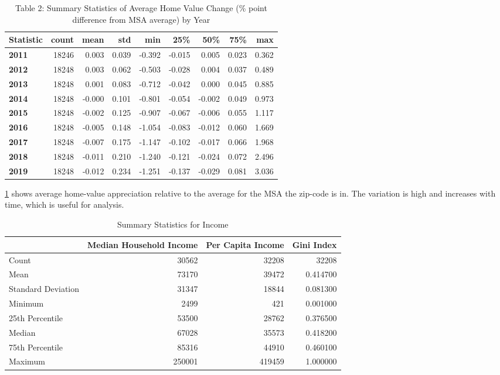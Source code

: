 \documentclass{article}
\begin{document}
\begin{table}[H]
    \centering
    \caption{Table 2: Summary Statistics of Average Home Value Change (\% point difference from MSA average) by Year}
    \label{home_val_table}
\begin{tabular}{l|rrrrrrrr}
\toprule
Statistic & count & mean & std & min & 25\% & 50\% & 75\% & max \\
\midrule
\textbf{2011} & 18246 & 0.003 & 0.039 & -0.392 & -0.015 & 0.005 & 0.023 & 0.362 \\
\textbf{2012} & 18248 & 0.003 & 0.062 & -0.503 & -0.028 & 0.004 & 0.037 & 0.489 \\
\textbf{2013} & 18248 & 0.001 & 0.083 & -0.712 & -0.042 & 0.000 & 0.045 & 0.885 \\
\textbf{2014} & 18248 & -0.000 & 0.101 & -0.801 & -0.054 & -0.002 & 0.049 & 0.973 \\
\textbf{2015} & 18248 & -0.002 & 0.125 & -0.907 & -0.067 & -0.006 & 0.055 & 1.117 \\
\textbf{2016} & 18248 & -0.005 & 0.148 & -1.054 & -0.083 & -0.012 & 0.060 & 1.669 \\
\textbf{2017} & 18248 & -0.007 & 0.175 & -1.147 & -0.102 & -0.017 & 0.066 & 1.968 \\
\textbf{2018} & 18248 & -0.011 & 0.210 & -1.240 & -0.121 & -0.024 & 0.072 & 2.496 \\
\textbf{2019} & 18248 & -0.012 & 0.234 & -1.251 & -0.137 & -0.029 & 0.081 & 3.036 \\
\bottomrule
\end{tabular}
\end{table}
\cref{home_val_table} shows average home-value appreciation relative to the average for the MSA the zip-code is in. The variation is high and increases with time, which is useful for analysis.
\begin{table}[H]
    \centering
    \caption{Summary Statistics for Income}
    \label{income-table}
    \begin{tabular}{l|rrr}
    \toprule
     & Median Household Income & Per Capita Income & Gini Index \\\midrule
    Count & 30562 & 32208 & 32208 \\
    Mean & 73170 & 39472 & 0.414700 \\
    Standard Deviation & 31347 & 18844 & 0.081300 \\
    Minimum & 2499 & 421 & 0.001000 \\
    25th Percentile & 53500 & 28762 & 0.376500 \\
    Median & 67028 & 35573 & 0.418200 \\
    75th Percentile & 85316 & 44910 & 0.460100 \\
    Maximum & 250001 & 419459 & 1.000000 \\\bottomrule
    \end{tabular}
\end{table}
\end{document}
